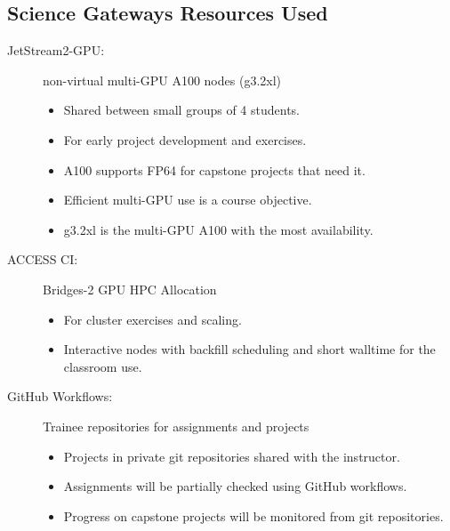 \documentclass[
portrait,
custom
]{sciposter}
\begin{document}
\begin{multicols}{2}
  \section*{Science Gateways Resources Used}
  \begin{description}
  \item[JetStream2-GPU:] non-virtual multi-GPU A100 nodes (g3.2xl)
    \begin{itemize}
    \item Shared between small groups of 4 students.
    \item For early project development and exercises.
    \item A100 supports FP64 for capstone projects that need it.
    \item Efficient multi-GPU use is a course objective.
    \item g3.2xl is the multi-GPU A100 with the most availability.
    \end{itemize}
  \item[ACCESS CI:] Bridges-2 GPU HPC Allocation
    \begin{itemize}
    \item For cluster exercises and scaling.
    \item Interactive nodes with backfill scheduling and short walltime %
    for the classroom use.
    \end{itemize}
  \item[GitHub Workflows:] Trainee repositories for assignments and projects
    \begin{itemize}
    \item Projects in private git repositories shared with the instructor.
    \item Assignments will be partially checked using GitHub workflows.
    \item Progress on capstone projects will be monitored from git repositories.
    \end{itemize}
  \end{description}


\end{multicols}
\end{document}
